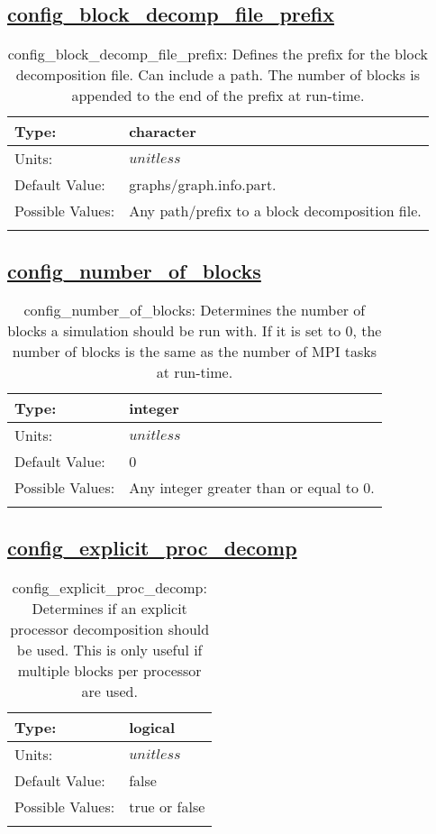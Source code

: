 \subsection[config\_block\_decomp\_file\_prefix]{\hyperref[sec:nm_tab_decomposition]{config\_block\_decomp\_file\_prefix}}
\label{subsec:nm_sec_config_block_decomp_file_prefix}
\begin{center}
\begin{longtable}{| p{2.0in} || p{4.0in} |}
    \hline
    Type: & character \\
    \hline
    Units: & $unitless$ \\
    \hline
    Default Value: & graphs/graph.info.part. \\
    \hline
    Possible Values: & Any path/prefix to a block decomposition file. \\
    \hline
    \caption{config\_block\_decomp\_file\_prefix: Defines the prefix for the block decomposition file. Can include a path. The number of blocks is appended to the end of the prefix at run-time.}
\end{longtable}
\end{center}
\subsection[config\_number\_of\_blocks]{\hyperref[sec:nm_tab_decomposition]{config\_number\_of\_blocks}}
\label{subsec:nm_sec_config_number_of_blocks}
\begin{center}
\begin{longtable}{| p{2.0in} || p{4.0in} |}
    \hline
    Type: & integer \\
    \hline
    Units: & $unitless$ \\
    \hline
    Default Value: & 0 \\
    \hline
    Possible Values: & Any integer greater than or equal to 0. \\
    \hline
    \caption{config\_number\_of\_blocks: Determines the number of blocks a simulation should be run with. If it is set to 0, the number of blocks is the same as the number of MPI tasks at run-time.}
\end{longtable}
\end{center}
\subsection[config\_explicit\_proc\_decomp]{\hyperref[sec:nm_tab_decomposition]{config\_explicit\_proc\_decomp}}
\label{subsec:nm_sec_config_explicit_proc_decomp}
\begin{center}
\begin{longtable}{| p{2.0in} || p{4.0in} |}
    \hline
    Type: & logical \\
    \hline
    Units: & $unitless$ \\
    \hline
    Default Value: & false \\
    \hline
    Possible Values: & true or false \\
    \hline
    \caption{config\_explicit\_proc\_decomp: Determines if an explicit processor decomposition should be used. This is only useful if multiple blocks per processor are used.}
\end{longtable}
\end{center}
